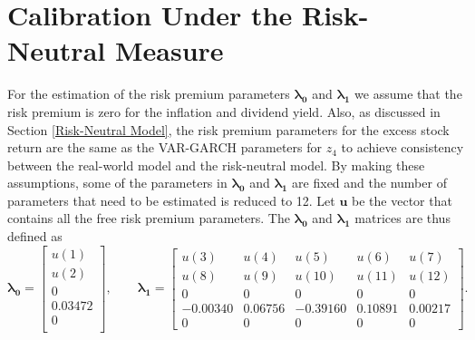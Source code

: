 \documentclass{sfuthesis}
\numberwithin{equation}{chapter}
\begin{document}
	
	
	\section{Calibration Under the Risk-Neutral Measure} 
	\label{Calibration Under the Risk-Neutral Measure}
	
		\justify
		For the estimation of the risk premium parameters $\boldsymbol{\lambda_0}$ and $\boldsymbol{\lambda_1}$ we assume that the risk premium is zero for the inflation and dividend yield. Also, as discussed in Section \ref{Risk-Neutral Model}, the risk premium parameters for the excess stock return are the same as the VAR-GARCH parameters for $z_{4}$ to achieve consistency between the real-world model and the risk-neutral model. By making these assumptions, some of the parameters in $\boldsymbol{\lambda_0}$ and $\boldsymbol{\lambda_1}$ are fixed and the number of parameters that need to be estimated is reduced to 12. Let $\boldsymbol{u}$ be the vector that contains all the free risk premium parameters. The $\boldsymbol{\lambda_0}$ and $\boldsymbol{\lambda_1}$ matrices are thus defined as
		\[
		\boldsymbol{\lambda_0} =
		\begin{bmatrix}
		u(1)  \\
		u(2)  \\  
		0   \\
		0.03472  \\
		0    \\
		
		\end{bmatrix},
		\qquad
		\boldsymbol{\lambda_{1}} =
		\begin{bmatrix}
		u(3)        &u(4)       &u(5)     &u(6)    &u(7)        \\
		u(8)        &u(9)       &u(10)    &u(11)   &u(12)       \\
		0           & 0         &0        & 0      &0           \\
		-0.00340   & 0.06756   &-0.39160  &0.10891 &0.00217   \\
		0			&0          &0        &0       &0
		
		\end{bmatrix}.
		\]
		
\end{document}
